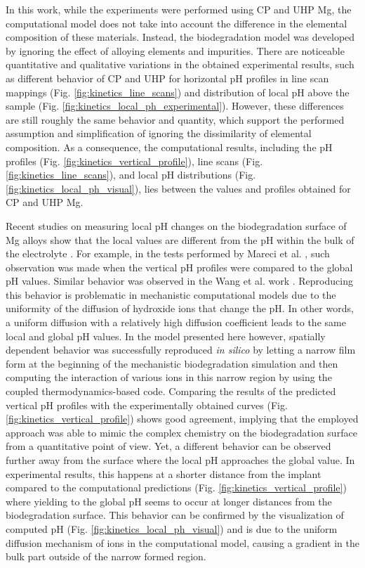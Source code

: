 In this work, while the experiments were performed using \gls{CP} and \gls{UHP} Mg, the computational model does not take into account the difference in the elemental composition of these materials. Instead, the biodegradation model was developed by ignoring the effect of alloying elements and impurities. There are noticeable quantitative and qualitative variations in the obtained experimental results, such as different behavior of \gls{CP} and \gls{UHP} for horizontal pH profiles in line scan mappings (Fig. \ref{fig:kinetics_line_scans}) and distribution of local pH above the sample (Fig. \ref{fig:kinetics_local_ph_experimental}). However, these differences are still roughly the same behavior and quantity, which support the performed assumption and simplification of ignoring the dissimilarity of elemental composition. As a consequence, the computational results, including the pH profiles (Fig. \ref{fig:kinetics_vertical_profile}), line scans (Fig. \ref{fig:kinetics_line_scans}), and local pH distributions (Fig. \ref{fig:kinetics_local_ph_visual}), lies between the values and profiles obtained for \gls{CP} and \gls{UHP} Mg.

Recent studies on measuring local pH changes on the biodegradation surface of Mg alloys show that the local values are different from the pH within the bulk of the electrolyte \cite{Gonzalez2021}. For example, in the tests performed by Mareci et al. \cite{Mareci2016}, such observation was made when the vertical pH profiles were compared to the global pH values. Similar behavior was observed in the Wang et al. work \cite{Wang2022}. Reproducing this behavior is problematic in mechanistic computational models due to the uniformity of the diffusion of hydroxide ions that change the pH. In other words, a uniform diffusion with a relatively high diffusion coefficient leads to the same local and global pH values. In the model presented here however, spatially dependent  behavior was successfully reproduced \textit{in silico} by letting a narrow film form at the beginning of the mechanistic biodegradation simulation and then computing the interaction of various ions in this narrow region by using the coupled thermodynamics-based code. Comparing the results of the predicted vertical pH profiles with the experimentally obtained curves (Fig. \ref{fig:kinetics_vertical_profile}) shows good agreement, implying that the employed approach was able to mimic the complex chemistry on the biodegradation surface from a quantitative point of view. Yet, a different behavior can be observed further away from the surface where the local pH approaches the global value. In experimental results, this happens at a shorter distance from the implant compared to the computational predictions (Fig. \ref{fig:kinetics_vertical_profile}) where yielding to the global pH seems to occur at longer distances from the biodegradation surface. This behavior can be confirmed by the visualization of computed pH (Fig. \ref{fig:kinetics_local_ph_visual}) and is due to the uniform diffusion mechanism of ions in the computational model, causing a gradient in the bulk part outside of the narrow formed region.

